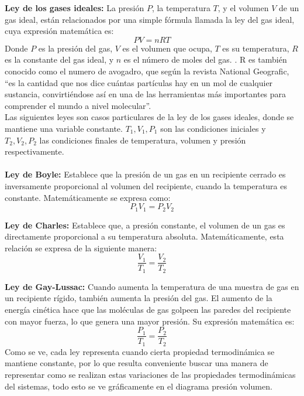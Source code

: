 \documentclass[12pt]{article}
\begin{document}
\textbf{Ley de los gases ideales:} La presión $P$, la temperatura $T$, y el volumen 
$V$ de un gas ideal, están relacionados por una simple fórmula llamada 
la ley del gas ideal, cuya expresión matemática es:
\[
PV=nRT
\]
Donde $P$ es la presión del gas, $V$ es el volumen que ocupa, $T$ es su 
temperatura, $R$ es la constante del gas ideal, y $n$ es el número de moles
del gas. \parencite{khanleygasesideales}. 
R es también conocido como el numero de avogadro, que según la revista National Geografic, ``es la cantidad que nos dice cuántas partículas hay en un mol de cualquier sustancia, convirtiéndose así en una de las herramientas más importantes para comprender el mundo a nivel molecular''. \parencite{nationalgeographic_avogadro_2022} \\

Las siguientes leyes son casos particulares de la ley de los gases ideales,
donde se mantiene una variable constante. $T_1, V_1, P_1$ son las condiciones
iniciales y $T_2, V_2, P_2$ las condiciones finales de temperatura, 
volumen y presión respectivamente.\\
\\
\textbf{Ley de Boyle:} Establece que la presión de un gas en un recipiente 
cerrado es inversamente proporcional al volumen del recipiente, cuando la 
temperatura es constante. \parencite{educaplusleyboyle} Matemáticamente se 
expresa como:
\[
P_1V_1=P_2V_2
\]

\textbf{Ley de Charles:} Establece que, a presión 
constante, el volumen de un gas es directamente proporcional a su 
temperatura absoluta. \parencite{masamleycharles} Matemáticamente, esta 
relación se expresa de la siguiente manera:
\[
\dfrac{V_1}{T_1}=\dfrac{V_2}{T_2}
\]

\textbf{Ley de Gay-Lussac:} Cuando aumenta la temperatura de una muestra 
de gas en un recipiente rígido, también aumenta la presión del gas. El 
aumento de la energía cinética hace que las moléculas de gas golpeen las 
paredes del recipiente con mayor fuerza, lo que genera una mayor presión.
\parencite{libretextsgaylussac} Su expresión matemática es:
\[
\dfrac{P_1}{T_1}=\dfrac{P_2}{T_2}
\]
Como se ve, cada ley representa cuando cierta propiedad termodinámica se mantiene constante, por lo que resulta conveniente buscar una manera de representar como se realizan estas variaciones de las propiedades termodinámicas del sistemas, todo esto se ve gráficamente en el diagrama presión volumen.
\end{document}
